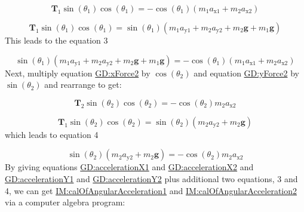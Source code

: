 \documentclass[12pt]{article}
\begin{document}
\begin{displaymath}
{\symbf{T}_{1}} \sin\left({θ_{1}}\right) \cos\left({θ_{1}}\right)=-\cos\left({θ_{1}}\right) \left({m_{1}} {a_{\text{x}1}}+{m_{2}} {a_{\text{x}2}}\right)
\end{displaymath}

\begin{displaymath}
{\symbf{T}_{1}} \sin\left({θ_{1}}\right) \cos\left({θ_{1}}\right)=\sin\left({θ_{1}}\right) \left({m_{1}} {a_{\text{y}1}}+{m_{2}} {a_{\text{y}2}}+{m_{2}} \symbf{g}+{m_{1}} \symbf{g}\right)
\end{displaymath}
This leads to the equation 3

\begin{displaymath}
\sin\left({θ_{1}}\right) \left({m_{1}} {a_{\text{y}1}}+{m_{2}} {a_{\text{y}2}}+{m_{2}} \symbf{g}+{m_{1}} \symbf{g}\right)=-\cos\left({θ_{1}}\right) \left({m_{1}} {a_{\text{x}1}}+{m_{2}} {a_{\text{x}2}}\right)
\end{displaymath}
Next, multiply equation \hyperref[GD:xForce2]{GD:xForce2} by $\cos\left({θ_{2}}\right)$ and equation \hyperref[GD:yForce2]{GD:yForce2} by $\sin\left({θ_{2}}\right)$ and rearrange to get:

\begin{displaymath}
{\symbf{T}_{2}} \sin\left({θ_{2}}\right) \cos\left({θ_{2}}\right)=-\cos\left({θ_{2}}\right) {m_{2}} {a_{\text{x}2}}
\end{displaymath}

\begin{displaymath}
{\symbf{T}_{1}} \sin\left({θ_{2}}\right) \cos\left({θ_{2}}\right)=\sin\left({θ_{2}}\right) \left({m_{2}} {a_{\text{y}2}}+{m_{2}} \symbf{g}\right)
\end{displaymath}
which leads to equation 4

\begin{displaymath}
\sin\left({θ_{2}}\right) \left({m_{2}} {a_{\text{y}2}}+{m_{2}} \symbf{g}\right)=-\cos\left({θ_{2}}\right) {m_{2}} {a_{\text{x}2}}
\end{displaymath}
By giving equations \hyperref[GD:accelerationX1]{GD:accelerationX1} and \hyperref[GD:accelerationX2]{GD:accelerationX2} and \hyperref[GD:accelerationY1]{GD:accelerationY1} and \hyperref[GD:accelerationY2]{GD:accelerationY2} plus additional two equations, 3 and 4, we can get \hyperref[IM:calOfAngularAcceleration1]{IM:calOfAngularAcceleration1} and \hyperref[IM:calOfAngularAcceleration2]{IM:calOfAngularAcceleration2} via a computer algebra program:
\end{document}
